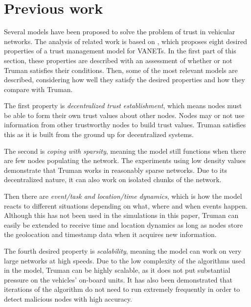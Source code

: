 \documentclass[conference]{IEEEtran}
\begin{document}


\section{Previous work}
\label{section:previouswork}

Several models have been proposed to solve the problem of trust in vehicular networks. 
The analysis of related work is based on \cite{zhang2011survey}, which proposes eight desired properties of a trust management model for VANETs.
In the first part of this section, these properties are described with an assessment of whether or not Truman satisfies their conditions.
Then, some of the most relevant models are described, considering how well they satisfy the desired properties and how they compare with Truman.

The first property is \textit{decentralized trust establishment}, which means nodes must be able to form their own trust values about other nodes.
Nodes may or not use information from other trustworthy nodes to build trust values.
Truman satisfies this as it is built from the ground up for decentralized systems.

The second is \textit{coping with sparsity}, meaning the model still functions when there are few nodes populating the network.
The experiments using low density values demonstrate that Truman works in reasonably sparse networks.
Due to its decentralized nature, it can also work on isolated chunks of the network.

Then there are \textit{event/task and location/time dynamics}, which is how the model reacts to different situations depending on what, where and when events happen.
Although this has not been used in the simulations in this paper, Truman can easily be extended to receive time and location dynamics as long as nodes store the geolocation and timestamp data when it acquires new information.

The fourth desired property is \textit{scalability}, meaning the model can work on very large networks at high speeds.
Due to the low complexity of the algorithms used in the model, Truman can be highly scalable, as it does not put substantial pressure on the vehicles' on-board units.
It has also been demonstrated that iterations of the algorithm do not need to run extremely frequently in order to detect malicious nodes with high accuracy.
\end{document}
